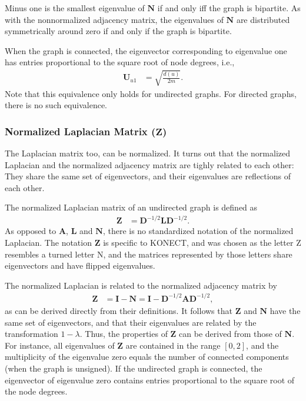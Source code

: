 \documentclass{article}
\begin{document}
Minus one is the smallest eigenvalue of $\mathbf N$ if and only iff the graph is
bipartite.  As with the nonnormalized adjacency matrix, the eigenvalues
of $\mathbf N$ are distributed symmetrically around zero if and only if
the graph is bipartite. 

When the graph is connected, 
the eigenvector corresponding to eigenvalue one has entries proportional
to the square root of node degrees, i.e.,
\begin{align}
  \mathbf U_{u1} &= \sqrt{\frac{d(u)}{2m}}.
\end{align}
Note that this equivalence only holds for undirected graphs.  For
directed graphs, there is no such equivalence. 

\subsubsection{Normalized Laplacian Matrix ($\mathbf Z$)}
The Laplacian matrix too, can be normalized.  It turns out that the
normalized Laplacian and the normalized adjacency matrix
are tighly related
to each other:  They share the same set of eigenvectors, and their
eigenvalues are reflections of each other.  

The normalized Laplacian matrix of an undirected graph is defined as 
\begin{align}
  \mathbf Z &= \mathbf D^{-1/2} \mathbf L \mathbf D^{-1/2}.
\end{align}
As opposed to $\mathbf A$, $\mathbf L$ and $\mathbf N$, there is no
standardized notation of the normalized Laplacian.  The notation
$\mathbf Z$ is specific to KONECT, and was chosen as the letter Z
resembles a turned letter N, and the matrices represented by those
letters share eigenvectors and have flipped eigenvalues. 

The normalized Laplacian is related to the normalized adjacency matrix
by 
\begin{align}
  \mathbf Z &= \mathbf I - \mathbf N = \mathbf I - \mathbf D^{-1/2}
  \mathbf A \mathbf D^{-1/2}, 
\end{align}
as can be derived directly from their definitions. 
It follows that $\mathbf Z$ and $\mathbf N$ have the same set of
eigenvectors, and that their eigenvalues are related by the
transformation $1 - \lambda$. Thus, the properties of $\mathbf Z$ can be
derived from those of $\mathbf N$. For instance, all eigenvalues of
$\mathbf Z$ are contained in the range $[0, 2]$, and the multiplicity of
the eigenvalue zero equals the number of connected components (when the
graph is unsigned). If the undirected graph is connected, the eigenvector of
eigenvalue zero contains entries proportional to the square root of the
node degrees. 
\end{document}
